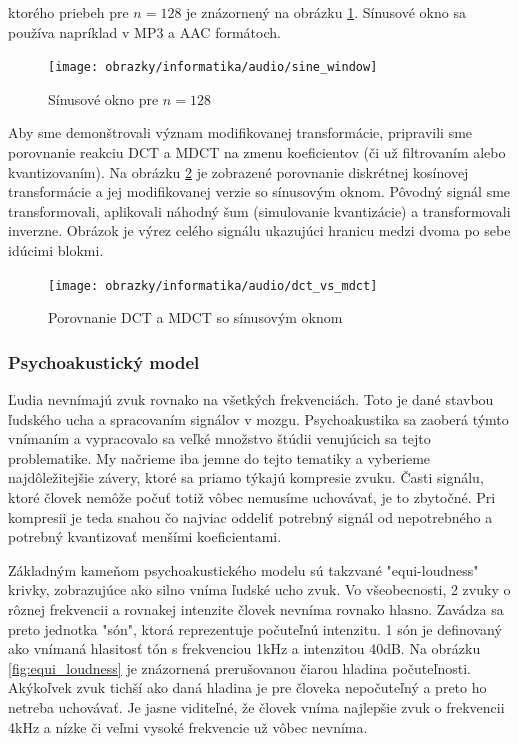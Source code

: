 ktorého priebeh pre $n=128$ je znázornený na obrázku
\ref{fig:sine_window}. Sínusové okno sa používa napríklad v MP3 a AAC
formátoch.

\begin{figure}[htp]
    \centering
    \texttt{[image: obrazky/informatika/audio/sine\_window]}
    \caption{Sínusové okno pre $n=128$}
    \label{fig:sine_window}
\end{figure}

Aby sme demonštrovali význam modifikovanej transformácie, pripravili
sme porovnanie reakciu DCT a MDCT na zmenu koeficientov (či už
filtrovaním alebo kvantizovaním).
Na obrázku \ref{fig:dct_vs_mdct} je zobrazené porovnanie diskrétnej
kosínovej transformácie a jej modifikovanej verzie so sínusovým oknom.
Pôvodný signál sme transformovali, aplikovali náhodný šum (simulovanie
kvantizácie) a transformovali inverzne. Obrázok je výrez celého
signálu ukazujúci hranicu medzi dvoma po sebe idúcimi blokmi.
\begin{figure}[htp]
    \centering
    \texttt{[image: obrazky/informatika/audio/dct\_vs\_mdct]}
    \caption{Porovnanie DCT a MDCT so sínusovým oknom}
    \label{fig:dct_vs_mdct}
\end{figure}

\subsubsection{Psychoakustický model}
Ľudia nevnímajú zvuk rovnako na všetkých frekvenciách. Toto je dané
stavbou ľudského ucha a spracovaním signálov v mozgu. Psychoakustika
sa zaoberá týmto vnímaním a vypracovalo sa veľké množstvo štúdii
venujúcich sa tejto problematike. My načrieme iba jemne do tejto
tematiky a vyberieme najdôležitejšie závery, ktoré sa priamo týkajú
kompresie zvuku. Časti signálu, ktoré človek nemôže počuť totiž vôbec
nemusíme uchovávať, je to zbytočné. Pri kompresii je teda snahou čo
najviac oddeliť potrebný signál od nepotrebného a potrebný kvantizovať
menšími koeficientami.

Základným kameňom psychoakustického modelu sú takzvané "equi-loudness"
krivky, zobrazujúce ako silno vníma ľudské ucho zvuk. Vo všeobecnosti,
2 zvuky o rôznej frekvencii a rovnakej intenzite človek nevníma rovnako hlasno.
Zavádza sa preto jednotka "són", ktorá reprezentuje počuteľnú
intenzitu. 1 són je definovaný ako vnímaná hlasitosť tón s frekvenciou
1kHz a intenzitou 40dB. Na obrázku \ref{fig:equi_loudness} je
znázornená prerušovanou čiarou hladina počuteľnosti. Akýkoľvek zvuk
tichší ako daná hladina je pre človeka nepočuteľný a preto ho netreba
uchovávať. Je jasne viditeľné, že človek vníma najlepšie zvuk o
frekvencii 4kHz a nízke či veľmi vysoké frekvencie už vôbec nevníma.

